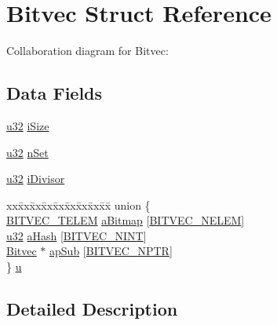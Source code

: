\hypertarget{struct_bitvec}{}\section{Bitvec Struct Reference}
\label{struct_bitvec}


Collaboration diagram for Bitvec\+:
\subsection*{Data Fields}
\begin{DoxyCompactItemize}
\item 
\hyperlink{sqlite3_8c_a03ad5adfaeb9b7640dde78a0cc390319}{u32} \hyperlink{struct_bitvec_abf05e7f8e9db5be6b0c2ddb466771371}{i\+Size}
\item 
\hyperlink{sqlite3_8c_a03ad5adfaeb9b7640dde78a0cc390319}{u32} \hyperlink{struct_bitvec_afbfe38f73c18658d067f031ff5744288}{n\+Set}
\item 
\hyperlink{sqlite3_8c_a03ad5adfaeb9b7640dde78a0cc390319}{u32} \hyperlink{struct_bitvec_af29bb9a512ce9ad608d5a29669e3eedf}{i\+Divisor}
\item 
\begin{tabbing}
xx\=xx\=xx\=xx\=xx\=xx\=xx\=xx\=xx\=\kill
union \{\\
\>\hyperlink{sqlite3_8c_a1529231c74dd2f84855767bd45a4a128}{BITVEC\_TELEM} \hyperlink{struct_bitvec_a3beb6cc100dfa1a84191dae2bf1111a3}{aBitmap} \mbox{[}\hyperlink{sqlite3_8c_a88b5a6f3a5220c5b59494a0945b25300}{BITVEC\_NELEM}\mbox{]}\\
\>\hyperlink{sqlite3_8c_a03ad5adfaeb9b7640dde78a0cc390319}{u32} \hyperlink{struct_bitvec_a07f34bff07a12239746401c393fdd1b6}{aHash} \mbox{[}\hyperlink{sqlite3_8c_a6631a81736378abeb3cd82ff1d373c7f}{BITVEC\_NINT}\mbox{]}\\
\>\hyperlink{struct_bitvec}{Bitvec} $\ast$ \hyperlink{struct_bitvec_a8bfaacfefd1acea1a2cdb3c84b2ec443}{apSub} \mbox{[}\hyperlink{sqlite3_8c_ac3a46fc9cd900e383c175cdd5eb3f633}{BITVEC\_NPTR}\mbox{]}\\
\} \hyperlink{struct_bitvec_ae26916aa5b937613bae3d5c61c31b57a}{u}\\

\end{tabbing}\end{DoxyCompactItemize}


\subsection{Detailed Description}


